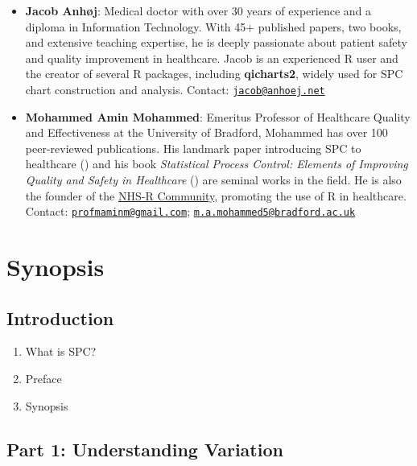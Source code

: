 \documentclass[
]{book}
\providecommand{\tightlist}{%
  \setlength{\itemsep}{0pt}\setlength{\parskip}{0pt}}
\begin{document}
\begin{itemize}
\item
  \textbf{Jacob Anhøj}: Medical doctor with over 30 years of experience and a diploma in Information Technology. With 45+ published papers, two books, and extensive teaching expertise, he is deeply passionate about patient safety and quality improvement in healthcare. Jacob is an experienced R user and the creator of several R packages, including \textbf{qicharts2}, widely used for SPC chart construction and analysis.
  Contact: \href{mailto:jacob@anhoej.net}{\nolinkurl{jacob@anhoej.net}}
\item
  \textbf{Mohammed Amin Mohammed}: Emeritus Professor of Healthcare Quality and Effectiveness at the University of Bradford, Mohammed has over 100 peer-reviewed publications. His landmark paper introducing SPC to healthcare () and his book \emph{Statistical Process Control: Elements of Improving Quality and Safety in Healthcare} () are seminal works in the field. He is also the founder of the \href{https://nhsrcommunity.com/}{NHS-R Community}, promoting the use of R in healthcare.
  Contact: \href{mailto:profmaminm@gmail.com}{\nolinkurl{profmaminm@gmail.com}}; \href{mailto:m.a.mohammed5@bradford.ac.uk}{\nolinkurl{m.a.mohammed5@bradford.ac.uk}}
\end{itemize}

\chapter*{Synopsis}\label{synopsis}

\section*{Introduction}\label{introduction}

\begin{enumerate}
\def\labelenumi{\arabic{enumi}.}
\tightlist
\item
  What is SPC?
\item
  Preface
\item
  Synopsis
\end{enumerate}

\section*{Part 1: Understanding Variation}\label{part-1-understanding-variation}
\end{document}
